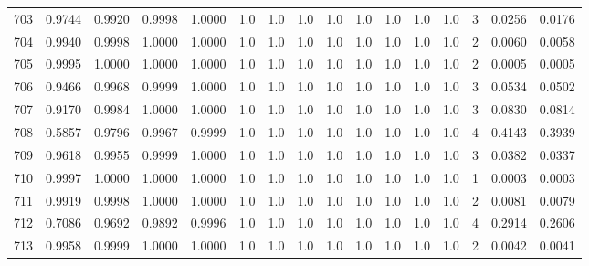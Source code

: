 \begin{tabular}{lrrrrrrrrrrrrrrr}
703 &      0.9744 &  0.9920 &  0.9998 &  1.0000 &     1.0 &     1.0 &     1.0 &     1.0 &     1.0 &     1.0 &      1.0 &        1.0 &      3 &                    0.0256 &                     0.0176 \\
704 &      0.9940 &  0.9998 &  1.0000 &  1.0000 &     1.0 &     1.0 &     1.0 &     1.0 &     1.0 &     1.0 &      1.0 &        1.0 &      2 &                    0.0060 &                     0.0058 \\
705 &      0.9995 &  1.0000 &  1.0000 &  1.0000 &     1.0 &     1.0 &     1.0 &     1.0 &     1.0 &     1.0 &      1.0 &        1.0 &      2 &                    0.0005 &                     0.0005 \\
706 &      0.9466 &  0.9968 &  0.9999 &  1.0000 &     1.0 &     1.0 &     1.0 &     1.0 &     1.0 &     1.0 &      1.0 &        1.0 &      3 &                    0.0534 &                     0.0502 \\
707 &      0.9170 &  0.9984 &  1.0000 &  1.0000 &     1.0 &     1.0 &     1.0 &     1.0 &     1.0 &     1.0 &      1.0 &        1.0 &      3 &                    0.0830 &                     0.0814 \\
708 &      0.5857 &  0.9796 &  0.9967 &  0.9999 &     1.0 &     1.0 &     1.0 &     1.0 &     1.0 &     1.0 &      1.0 &        1.0 &      4 &                    0.4143 &                     0.3939 \\
709 &      0.9618 &  0.9955 &  0.9999 &  1.0000 &     1.0 &     1.0 &     1.0 &     1.0 &     1.0 &     1.0 &      1.0 &        1.0 &      3 &                    0.0382 &                     0.0337 \\
710 &      0.9997 &  1.0000 &  1.0000 &  1.0000 &     1.0 &     1.0 &     1.0 &     1.0 &     1.0 &     1.0 &      1.0 &        1.0 &      1 &                    0.0003 &                     0.0003 \\
711 &      0.9919 &  0.9998 &  1.0000 &  1.0000 &     1.0 &     1.0 &     1.0 &     1.0 &     1.0 &     1.0 &      1.0 &        1.0 &      2 &                    0.0081 &                     0.0079 \\
712 &      0.7086 &  0.9692 &  0.9892 &  0.9996 &     1.0 &     1.0 &     1.0 &     1.0 &     1.0 &     1.0 &      1.0 &        1.0 &      4 &                    0.2914 &                     0.2606 \\
713 &      0.9958 &  0.9999 &  1.0000 &  1.0000 &     1.0 &     1.0 &     1.0 &     1.0 &     1.0 &     1.0 &      1.0 &        1.0 &      2 &                    0.0042 &                     0.0041 \\

\end{tabular}
